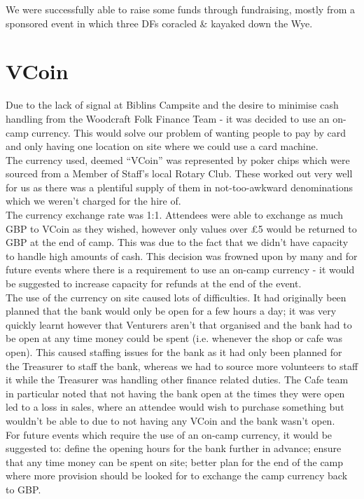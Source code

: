 We were successfully able to raise some funds through fundraising, mostly from a sponsored event in which three DFs coracled \& kayaked down the Wye. 

\section{VCoin}
Due to the lack of signal at Biblins Campsite and the desire to minimise cash handling from the Woodcraft Folk Finance Team - it was decided to use an on-camp currency. This would solve our problem of wanting people to pay by card and only having one location on site where we could use a card machine.\\

The currency used, deemed ``VCoin'' was represented by poker chips which were sourced from a Member of Staff's local Rotary Club. These worked out very well for us as there was a plentiful supply of them in not-too-awkward denominations which we weren't charged for the hire of.\\

The currency exchange rate was 1:1. Attendees were able to exchange as much GBP to VCoin as they wished, however only values over \pounds5 would be returned to GBP at the end of camp. This was due to the fact that we didn't have capacity to handle high amounts of cash. This decision was frowned upon by many and for future events where there is a requirement to use an on-camp currency - it would be suggested to increase capacity for refunds at the end of the event.\\

The use of the currency on site caused lots of difficulties. It had originally been planned that the bank would only be open for a few hours a day; it was very quickly learnt however that Venturers aren't that organised and the bank had to be open at any time money could be spent (i.e. whenever the shop or cafe was open). This caused staffing issues for the bank as it had only been planned for the Treasurer to staff the bank, whereas we had to source more volunteers to staff it while the Treasurer was handling other finance related duties. The Cafe team in particular noted that not having the bank open at the times they were open led to a loss in sales, where an attendee would wish to purchase something but wouldn't be able to due to not having any VCoin and the bank wasn't open. \\

For future events which require the use of an on-camp currency, it would be suggested to: define the opening hours for the bank further in advance; ensure that any time money can be spent on site; better plan for the end of the camp where more provision should be looked for to exchange the camp currency back to GBP. 

